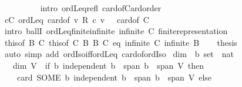 \begin{isabellebody}
\ \ \ \ \ \ \ \ \isamarkupfalse%
\ {\isacharparenleft}{\kern0pt}intro\ ordLeq{\isacharunderscore}{\kern0pt}refl\ card{\isacharunderscore}{\kern0pt}of{\isacharunderscore}{\kern0pt}Card{\isacharunderscore}{\kern0pt}order{\isacharparenright}{\kern0pt}\isanewline
\ \ \ \ \ \ \isamarkupfalse%
\ {\isachardoublequoteopen}{\isasymforall}c{\isasymin}C{\isachardot}{\kern0pt}\ ordLeq{}\ {\isacharparenleft}{\kern0pt}card{\isacharunderscore}{\kern0pt}of\ {\isacharbraceleft}{\kern0pt}v{\isachardot}{\kern0pt}\ {\isacharquery}{\kern0pt}R\ c\ v\ {\isasymnoteq}\ {}{\isacharbraceright}{\kern0pt}{\isacharparenright}{\kern0pt}\ {\isacharparenleft}{\kern0pt}card{\isacharunderscore}{\kern0pt}of\ C{\isacharparenright}{\kern0pt}{\isachardoublequoteclose}\isanewline
\ \ \ \ \ \ \ \ \isamarkupfalse%
\ {\isacharparenleft}{\kern0pt}intro\ ballI\ ordLeq{}{\isacharunderscore}{\kern0pt}finite{\isacharunderscore}{\kern0pt}infinite\ {\isacartoucheopen}infinite\ C{\isacartoucheclose}\ finite{\isacharunderscore}{\kern0pt}representation{\isacharparenright}{\kern0pt}\isanewline
\ \ \ \ \isamarkupfalse%
\ \isacommand{{\isacharbraceright}{\kern0pt}}\isamarkupfalse%
\isanewline
\ \ \isamarkupfalse%
\ this{\isacharbrackleft}{\kern0pt}of\ B\ C{\isacharbrackright}{\kern0pt}\ this{\isacharbrackleft}{\kern0pt}of\ C\ B{\isacharbrackright}{\kern0pt}\ B\ C\ eq\ {\isacartoucheopen}infinite\ C{\isacartoucheclose}\ {\isacartoucheopen}infinite\ B{\isacartoucheclose}\isanewline
\ \ \isamarkupfalse%
\ {\isacharquery}{\kern0pt}thesis\ \isamarkupfalse%
\ {\isacharparenleft}{\kern0pt}auto\ simp\ add{\isacharcolon}{\kern0pt}\ ordIso{\isacharunderscore}{\kern0pt}iff{\isacharunderscore}{\kern0pt}ordLeq\ card{\isacharunderscore}{\kern0pt}of{\isacharunderscore}{\kern0pt}ordIso{\isacharparenright}{\kern0pt}\isanewline
{}\isamarkupfalse%
%
\endisatagproof
{\isafoldproof}%
%
\isadelimproof
\isanewline
%
\endisadelimproof
\isanewline
{}\isamarkupfalse%
\ dim\ {\isacharcolon}{\kern0pt}{\isacharcolon}{\kern0pt}\ {\isachardoublequoteopen}{\isacharprime}{\kern0pt}b\ set\ {\isasymRightarrow}\ nat{\isachardoublequoteclose}\isanewline
\ \ \ {\isachardoublequoteopen}dim\ V\ {\isacharequal}{\kern0pt}\ {\isacharparenleft}{\kern0pt}if\ {\isasymexists}b{\isachardot}{\kern0pt}\ independent\ b\ {\isasymand}\ span\ b\ {\isacharequal}{\kern0pt}\ span\ V\ then\isanewline
\ \ \ \ card\ {\isacharparenleft}{\kern0pt}SOME\ b{\isachardot}{\kern0pt}\ independent\ b\ {\isasymand}\ span\ b\ {\isacharequal}{\kern0pt}\ span\ V{\isacharparenright}{\kern0pt}\ else\ {}{\isacharparenright}{\kern0pt}{\isachardoublequoteclose}\isanewline

\end{isabellebody}
